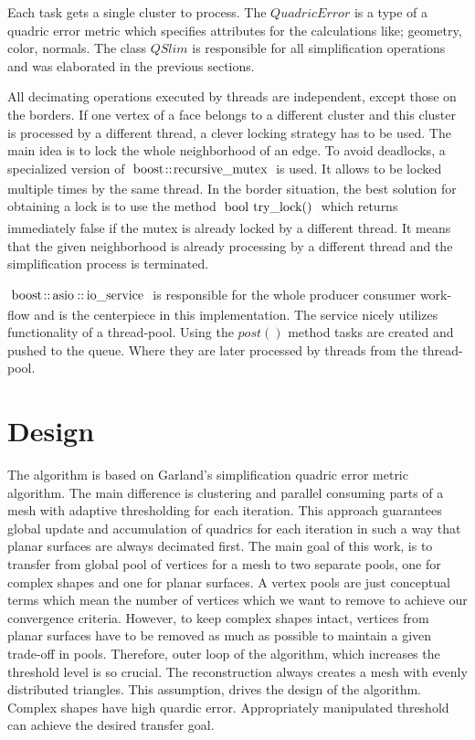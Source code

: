 Each task gets a single cluster to process. The $QuadricError$ is a type of a quadric error metric which specifies attributes for the calculations like; geometry, color, normals. The class $QSlim$ is responsible for all simplification operations and was elaborated in the previous sections.

All decimating operations executed by threads are independent, except those on the borders. If one vertex of a face belongs to a different cluster and this cluster is processed by a different thread, a clever locking strategy has to be used. The main idea is to lock the whole neighborhood of an edge. To avoid deadlocks, a specialized version of $\inlinecode{Java}{boost::recursive_mutex}$ is used. It allows to be locked multiple times by the same thread. In the border situation, the best solution for obtaining a lock is to use the method $\inlinecode{Java}{bool try_lock()}$ which returns immediately false if the mutex is already locked by a different thread. It means that the given neighborhood is already processing by a different thread and the simplification process is terminated.

$\inlinecode{Java}{boost::asio::io_service}$ is responsible for the whole producer consumer work-flow and is the centerpiece in this implementation. The service nicely utilizes functionality of a thread-pool. Using the $post()$ method tasks are created and pushed to the queue. Where they are later processed by threads from the thread-pool.

\newpage
\section{Design}

The algorithm is based on Garland's simplification quadric error metric algorithm. The main difference is clustering and parallel consuming parts of a mesh with adaptive thresholding for each iteration. This approach guarantees global update and accumulation of quadrics for each iteration in such a way that planar surfaces are always decimated first. The main goal of this work, is to transfer from global pool of vertices for a mesh to two separate pools, one for complex shapes and one for planar surfaces. A vertex pools are just conceptual terms which mean the number of vertices which we want to remove to achieve our convergence criteria. However, to keep complex shapes intact, vertices from planar surfaces have to be removed as much as possible to maintain a given trade-off in pools. Therefore, outer loop of the algorithm, which increases the threshold level is so crucial. The reconstruction always creates a mesh with evenly distributed triangles. This assumption, drives the design of the algorithm. Complex shapes have high quardic error. Appropriately manipulated threshold can achieve the desired transfer goal.

